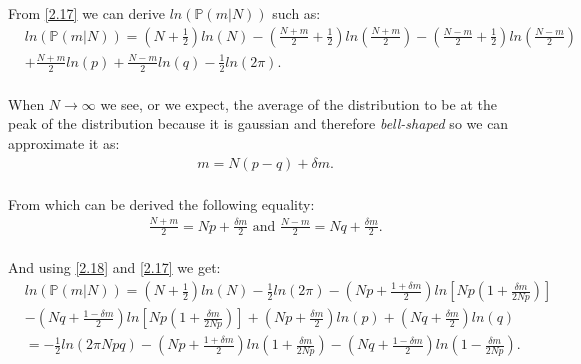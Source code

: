 \documentclass[12pt]{article}
\numberwithin{equation}{section}
\begin{document}
From \ref{2.17} we can derive $ln (\mathbb{P}(m | N))$ such as:
\begin{equation} \label{2.17}
    \begin{split}
          & ln(\mathbb{P}(m | N)) = \left(N + \frac{1}{2}\right)ln(N) - \left(\frac{N+m}{2}+\frac{1}{2}\right)ln\left(\frac{N+m}{2}\right)-\left(\frac{N-m}{2}+\frac{1}{2}\right)ln\left(\frac{N-m}{2}\right) \\
          & + \frac{N+m}{2}ln(p) + \frac{N-m}{2}ln(q) - \frac{1}{2}ln(2\pi). \\
    \end{split}
\end{equation}

When $N \rightarrow \infty$ we see, or we expect, the average of the distribution to be at the peak of the distribution because it is gaussian and therefore \emph{bell-shaped} so we can approximate it as:
\begin{equation} \label{2.18}
    \begin{split}
          & m = N(p - q) + \delta m. \\
    \end{split}
\end{equation}

From which can be derived the following equality: 
\begin{equation} \label{2.18}
    \begin{split}
          & \frac{N+m}{2} = Np+\frac{\delta m}{2} \text{ and } \frac{N-m}{2} = Nq+\frac{\delta m}{2}. \\
    \end{split}
\end{equation}

And using \ref{2.18} and \ref{2.17} we get: 
\begin{equation} \label{2.18}
    \begin{split}
          & ln(\mathbb{P}(m | N)) = \left(N + \frac{1}{2}\right)ln(N) - \frac{1}{2}ln(2\pi) - \left(Np + \frac{1+\delta m}{2}\right) ln \left[Np\left(1 + \frac{\delta m}{2Np}\right)\right] \\
          & - \left(Nq + \frac{1- \delta m}{2}\right) ln \left[Np\left(1 + \frac{\delta m}{2Np}\right)\right] + \left(Np + \frac{\delta m}{2}\right)ln(p) + \left(Nq + \frac{\delta m}{2}\right) ln(q) \\
          & = -\frac{1}{2} ln(2\pi N pq) - \left(Np + \frac{1 + \delta m}{2}\right)ln\left(1 + \frac{\delta m}{2 Np}\right) - \left(Nq + \frac{1 - \delta m}{2}\right) ln\left(1 - \frac{\delta m}{2Np}\right). \\
    \end{split}
\end{equation}
\end{document}
